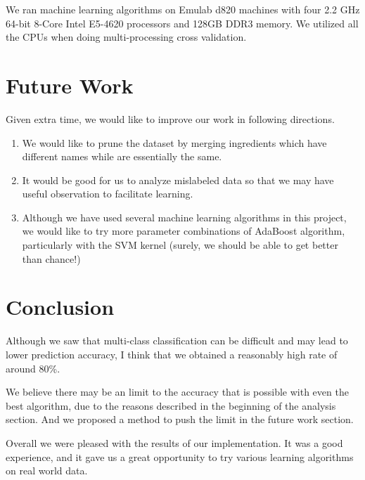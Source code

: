 \documentclass[11pt]{article}
\begin{document}
We ran machine learning algorithms on Emulab d820\cite{emulab-wiki}
machines with four 2.2 GHz 64-bit 8-Core Intel E5-4620 processors and
128GB DDR3 memory. We utilized all the CPUs when doing
multi-processing cross validation. 







\section{Future Work}
Given extra time, we would like to improve our work in following
directions. 
\begin{enumerate}
	\item We would like to prune the dataset by merging
          ingredients which have different names while are essentially
          the same.   
	\item It would be good for us to analyze mislabeled data so
          that we may have useful observation to facilitate learning.
	\item Although we have used several machine learning
          algorithms in this project, we would like to try more
          parameter combinations of AdaBoost algorithm, particularly
          with the SVM kernel (surely, we should be able to get better
          than chance!)
\end{enumerate}

\section{Conclusion}
Although we saw that multi-class classification can be difficult and
may lead to lower prediction accuracy, I think that we obtained a
reasonably high rate of around 80\%.  

We believe there may be an limit to the accuracy that is possible with
even the best algorithm, due to the reasons described in the beginning
of the analysis section. And we proposed a method to push the limit in
the future work section. 


Overall we were pleased with the results of our implementation.  It
was a good experience, and it gave us a great opportunity to try
various learning algorithms on real world data.



\end{document}
